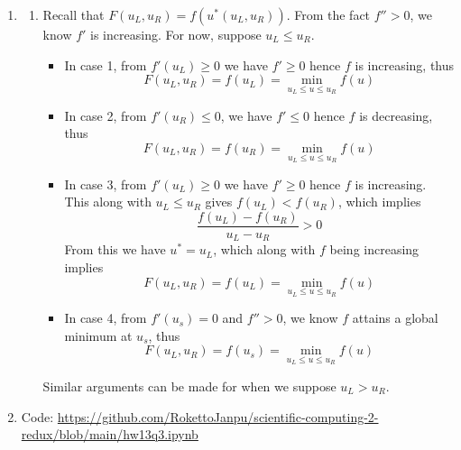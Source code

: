 \documentclass{article}
\begin{document}
\begin{enumerate}
\item

\begin{enumerate}
	
	
	\item Recall that $F(u_L,u_R)=f(u^*(u_L,u_R))$. From the fact $f''>0$, we know $f'$ is increasing. For now, suppose $u_L\le u_R$.
	\begin{itemize}
		\item In case 1, from $f'(u_L)\ge0$ we have $f'\ge0$ hence $f$ is increasing, thus
		\[F(u_L,u_R) = f(u_L) = \min_{u_L\le u\le u_R}f(u)\]
		\item In case 2, from $f'(u_R)\le0$, we have $f'\le0$ hence $f$ is decreasing, thus
		\[F(u_L,u_R) = f(u_R) = \min_{u_L\le u\le u_R}f(u)\]
		\item In case 3, from $f'(u_L)\ge0$ we have $f'\ge0$ hence $f$ is increasing. This along with $u_L\le u_R$ gives $f(u_L)<f(u_R)$, which implies 
		\[\frac{f(u_L)-f(u_R)}{u_L-u_R} > 0\]
		From this we have $u^*=u_L$, which along with $f$ being increasing implies
		\[F(u_L,u_R) = f(u_L) = \min_{u_L\le u\le u_R}f(u)\]
		\item In case 4, from $f'(u_s)=0$ and $f''>0$, we know $f$ attains a global minimum at $u_s$, thus
		\[F(u_L,u_R) = f(u_s) = \min_{u_L\le u\le u_R}f(u)\]
	\end{itemize}
	Similar arguments can be made for when we suppose $u_L>u_R$.
	
\end{enumerate}



\item Code: \url{https://github.com/RokettoJanpu/scientific-computing-2-redux/blob/main/hw13q3.ipynb}


\end{enumerate}
\end{document}
